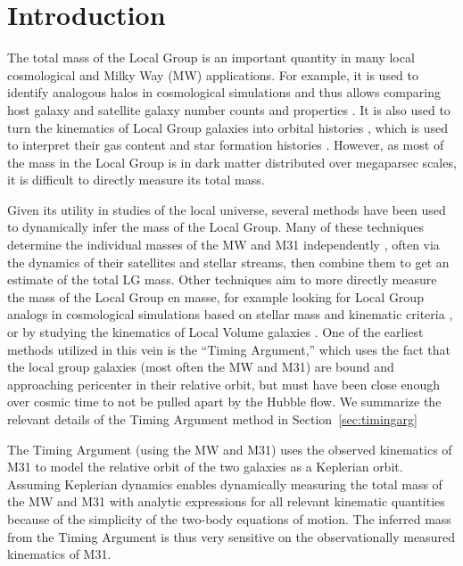 \documentclass[twocolumn]{aastex631}
\begin{document}
\section{Introduction}
\label{sec:intro}
The total mass of the Local Group is an important quantity in many local
cosmological and Milky Way (MW) applications.
For example, it is used to identify analogous halos in cosmological simulations
and thus allows comparing host galaxy and satellite galaxy number counts and
properties \citep[e.g.,][]{Patel2017a, Marinacci:2017, Dooley2017, Besla2018,
Patel2018, Garrison-Kimmel:2019a, Garrison-Kimmel:2019b, Sawala2022}.
It is also used to turn the kinematics of Local Group
galaxies into orbital histories \citep[e.g.,][]{Peebles:2017}, which is used to
interpret their gas content \citep[e.g.,][]{Fillingham:2018,Putman:2021} and
star formation histories \citep[e.g.,][]{Tolstoy:2009}.
However, as most of the mass in the Local Group is in dark matter distributed
over megaparsec scales, it is difficult to directly measure its total mass.

Given its utility in studies of the local universe, several methods have been
used to dynamically infer the mass of the Local Group.
Many of these techniques determine the individual masses of the MW and M31
independently \citep[e.g.][]{Watkins2010, Diaz2014, Patel2018, Eadie:2019,
Fritz:2020, Deason:2021, Wang:2022}, often via the dynamics of their satellites
and stellar streams, then combine them to get an estimate of the total LG mass.
Other techniques aim to more directly measure the mass of the Local Group en
masse, for example looking for Local Group analogs in cosmological simulations
based on stellar mass and kinematic criteria \citep[e.g.,][]{Zhai2020}, or by
studying the kinematics of Local Volume galaxies
\citep[e.g.,][]{Penarrubia2014}.
One of the earliest methods utilized in this vein is the ``Timing Argument,''
which uses the fact that the local group galaxies (most often the MW and M31)
are bound and approaching pericenter in their relative orbit, but must have been
close enough over cosmic time to not be pulled apart by the Hubble flow. We
summarize the relevant details of the Timing Argument method in
Section~\ref{sec:timingarg}

The Timing Argument (using the MW and M31) uses the observed kinematics of M31
to model the relative orbit of the two galaxies as a Keplerian orbit.
Assuming Keplerian dynamics enables dynamically measuring the total mass of the
MW and M31 with analytic expressions for all relevant kinematic quantities
because of the simplicity of the two-body equations of motion. 
The inferred mass from the Timing Argument is thus very sensitive on the
observationally measured kinematics of M31. 
\end{document}
